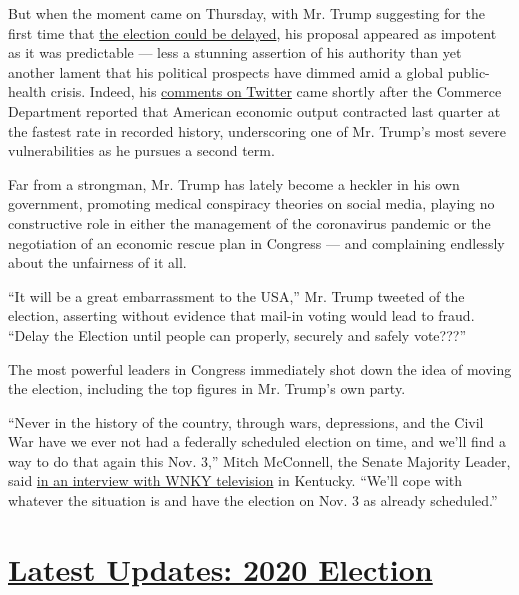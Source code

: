 But when the moment came on Thursday, with Mr. Trump suggesting for the
first time that
\href{https://www.nytimes.com/2020/07/31/us/politics/trump-tweet-democracy.html}{the
election could be delayed}, his proposal appeared as impotent as it was
predictable --- less a stunning assertion of his authority than yet
another lament that his political prospects have dimmed amid a global
public-health crisis. Indeed, his
\href{https://www.nytimes.com/2020/07/31/us/politics/trump-tweet-democracy.html}{comments
on Twitter} came shortly after the Commerce Department reported that
American economic output contracted last quarter at the fastest rate in
recorded history, underscoring one of Mr. Trump's most severe
vulnerabilities as he pursues a second term.

Far from a strongman, Mr. Trump has lately become a heckler in his own
government, promoting medical conspiracy theories on social media,
playing no constructive role in either the management of the coronavirus
pandemic or the negotiation of an economic rescue plan in Congress ---
and complaining endlessly about the unfairness of it all.

``It will be a great embarrassment to the USA,'' Mr. Trump tweeted of
the election, asserting without evidence that mail-in voting would lead
to fraud. ``Delay the Election until people can properly, securely and
safely vote???''

The most powerful leaders in Congress immediately shot down the idea of
moving the election, including the top figures in Mr. Trump's own party.

``Never in the history of the country, through wars, depressions, and
the Civil War have we ever not had a federally scheduled election on
time, and we'll find a way to do that again this Nov. 3,'' Mitch
McConnell, the Senate Majority Leader, said
\href{https://twitter.com/MaxWinitz/status/1288875891985129480?s=20}{in
an interview with WNKY television} in Kentucky. ``We'll cope with
whatever the situation is and have the election on Nov. 3 as already
scheduled.''

\hypertarget{latest-updates-2020-election}{%
\section{\texorpdfstring{\href{https://www.nytimes.com/2020/07/31/us/elections/biden-vs-trump.html?action=click\&pgtype=Article\&state=default\&region=MAIN_CONTENT_1\&context=storylines_live_updates}{Latest
Updates: 2020
Election}}{Latest Updates: 2020 Election}}\label{latest-updates-2020-election}}

